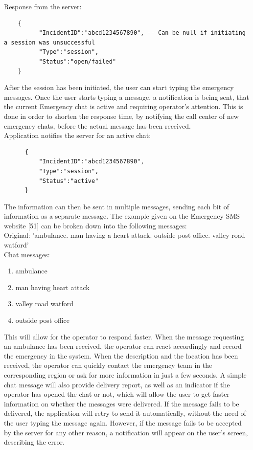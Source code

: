 \documentclass{article}
\begin{document}
Response from the server:
\begin{lstlisting}
	{
          "IncidentID":"abcd1234567890", -- Can be null if initiating a session was unsuccessful
          "Type":"session",
          "Status":"open/failed"
	}
\end{lstlisting}
After the session has been initiated, the user can start typing the emergency messages. Once the user starts typing a message, a notification is being sent, that the current Emergency chat is active and requiring operator’s attention. This is done in order to shorten the response time, by notifying the call center of new emergency chats, before the actual message has been received.\\

Application notifies the server for an active chat:
\begin{lstlisting}
      {
          "IncidentID":"abcd1234567890",
          "Type":"session",
          "Status":"active"
      }
\end{lstlisting}

The information can then be sent in multiple messages, sending each bit of information as a separate message. The example given on the Emergency SMS website [51] can be broken down into the following messages:\\

Original: 'ambulance. man having a heart attack. outside post office. valley road watford'\\

Chat messages:
\begin{enumerate}

\item ambulance
\item man having heart attack
\item valley road watford
\item outside post office

\end{enumerate}
This will allow for the operator to respond faster. When the message requesting an ambulance has been received, the operator can react accordingly and record the emergency in the system. When the description and the location has been received, the operator can quickly contact the emergency team in the corresponding region or ask for more information in just a few seconds. A simple chat message will also provide delivery report, as well as an indicator if the operator has opened the chat or not, which will allow the user to get faster information on whether the messages were delivered. If the message fails to be delivered, the application will retry to send it automatically, without the need of the user typing the message again. However, if the message fails to be accepted by the server for any other reason, a notification will appear on the user’s screen, describing the error.\\
\end{document}
